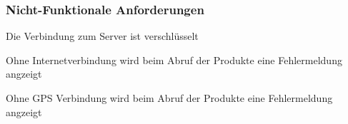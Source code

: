 \subsubsection{Nicht-Funktionale Anforderungen}
\begin{todolist}
	\item[\done] Die Verbindung zum Server ist verschlüsselt
	\item[\done] Ohne Internetverbindung wird beim Abruf der Produkte eine Fehlermeldung angzeigt
	\item[\done] Ohne GPS Verbindung wird beim Abruf der Produkte eine Fehlermeldung angzeigt
\end{todolist}




